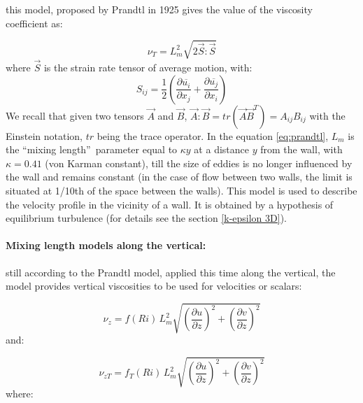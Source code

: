 this model, proposed by Prandtl 
\cite{prandtl25} in 1925 gives the value of the viscosity coefficient as:

\begin{equation}\label{eq:prandtl}
  \nu_T=L_{m}^{2}\sqrt{2\vec{S}:\vec{S}} %
\end{equation}
where $\vec{S}$ is the strain rate tensor 
of average motion, with:
\begin{equation}
  S_{ij}=\dfrac{1}{2}\left(  \dfrac{\partial\overline{u_{i}}}{\partial x_{j}}
  + \dfrac{\partial\overline{u_{j}}}{\partial x_{i}}\right)
\end{equation}
We recall that given two tensors $\vec{A}$ and $\vec{B}$, $\vec{A}\!:\!\vec{B} = tr(\vec{A}\vec{B}^T) = A_{ij}B_{ij}$
with the Einstein notation, $tr$ being the trace operator. In the equation \eqref{eq:prandtl},
$L_{m}$ is the \textquotedblleft mixing length\textquotedblright\ parameter
equal to $\kappa y$ at a distance $y$ from the wall, with $\kappa=0.41$ (von
Karman constant), till the size of eddies is no longer
influenced by the wall and remains constant (in the case of flow between two
walls, the limit is situated at 1/10th of the space between the walls).
This model is used to describe the velocity profile in the vicinity of a wall.
It is obtained by a hypothesis of equilibrium turbulence
(for details see the section \ref{k-epsilon 3D}).

\paragraph{\label{longueur de melange sur la verticale}Mixing length models
  along the vertical:}

still according to the Prandtl model, applied this time along the vertical,
the model provides vertical viscosities to be used for velocities or scalars:%

\begin{equation}
  \nu_{z}=f(Ri)\,L_{m}^{2}\sqrt{\left(  \dfrac{\partial u}{\partial z}\right)
    ^{2}+\left(  \dfrac{\partial v}{\partial z}\right)  ^{2}}%
\end{equation}
and:%

\begin{equation}
  \nu_{zT}=f_{T}(Ri)\,L_{m}^{2}\sqrt{\left(  \dfrac{\partial u}{\partial
        z}\right)  ^{2}+\left(  \dfrac{\partial v}{\partial z}\right)  ^{2}}%
\end{equation}
where:%

